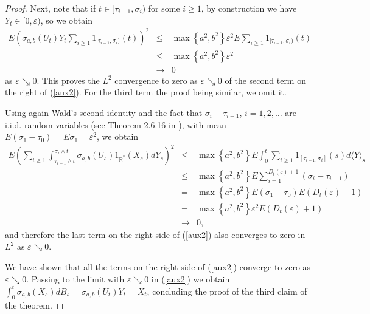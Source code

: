 \documentclass[reqno]{amsart}
\theoremstyle{definition}
\theoremstyle{remark}
\numberwithin{equation}{section}
\begin{document}
\begin{proof}
Next, note that if $t\in \lbrack \tau _{i-1},\sigma _{i})$ for some $i\geq 1$, by construction we have $Y_{t}\in \lbrack 0,\varepsilon )$, so we obtain\begin{eqnarray*}
E\left( \sigma _{a,b}\left( U_{t}\right) Y_{t}\sum_{i\geq 1}1_{[\tau
_{i-1},\sigma _{i})}\left( t\right) \right) ^{2}&\leq & \max \left\{
a^2,b^2 \right\} \varepsilon ^{2}E\sum_{i\geq 1}1_{[\tau _{i-1},\sigma
_{i})}\left( t\right) \\
&\leq & \max \left\{ a^2,b^2\right\} \varepsilon
^{2}\\
&\rightarrow& 0
\end{eqnarray*}
as $\varepsilon \searrow 0$. This proves the $L^2$ convergence to zero as $\varepsilon \searrow 0$ of the second term on the right of (\ref{aux2}). For
the third term the proof being similar, we omit it.

Using again Wald's second identity and the fact
that $\sigma _{i}-\tau _{i-1}$, $i=1,2,\ldots $ are
i.i.d. random variables (see Theorem 2.6.16 in \cite{Karatzas-Shreve}), with
mean $E\left( \sigma _{1}-\tau _{0}\right) = E\sigma _{1}=\varepsilon ^{2}$, we obtain
\begin{eqnarray*}
E\left( \sum_{i\geq 1}\int_{\tau _{i-1}\wedge t}^{\sigma _{i}\wedge t}\sigma
_{a,b}\left( U_{s}\right) 1_{\mathbb{R}^{\ast }}\left( X_{s}\right) dY_{s}\right)
^{2} &\leq&\max \left\{ a^{2},b^{2}\right\} E\int_{0}^{t}\sum_{i\geq
1}1_{[\tau _{i-1},\sigma _{i}]}\left( s\right) d\langle Y\rangle _{s} \\
&\leq &\max \left\{ a^{2},b^{2}\right\} E\sum_{i=1}^{D_{t}\left( \varepsilon
\right) +1}\left( \sigma _{i}-\tau _{i-1}\right) \\
&=&\max \left\{ a^{2},b^{2}\right\} E\left( \sigma _{1}-\tau _{0}\right)
E\left( D_{t}\left( \varepsilon \right) +1\right) \\
&=&\max \left\{ a^{2},b^{2}\right\} \varepsilon ^{2}E\left( D_{t}\left(
\varepsilon \right) +1\right) \\
&\rightarrow &0,
\end{eqnarray*}and therefore the last term on the right side of (\ref{aux2}) also converges
to zero in $L^2$ as $\varepsilon \searrow 0$.

We have shown that all the terms on the right side of (\ref{aux2}) converge
to zero as $\varepsilon \searrow 0$. Passing to the limit with $\varepsilon
\searrow 0$ in (\ref{aux2}) we obtain $\int_{0}^{t}\sigma _{a,b}\left(
X_{s}\right) dB_{s}=\sigma _{a,b}\left( U_{t}\right) Y_{t}=X_{t}$,
concluding the proof of the third claim of the theorem.\label{pagina de sfarsit referinta}


\end{proof}
\end{document}
